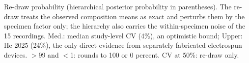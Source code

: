 Re-draw probability (hierarchical posterior probability in parentheses). The re-draw treats the observed composition means as exact and perturbs them by the specimen factor only; the hierarchy also carries the within-specimen noise of the 15 recordings. Med.: median study-level CV (4\%), an optimistic bound; Upper: He 2025 (24\%), the only direct evidence from separately fabricated electrospun devices. $>$99 and $<$1: rounds to 100 or 0 percent. CV at 50\%: re-draw only.
